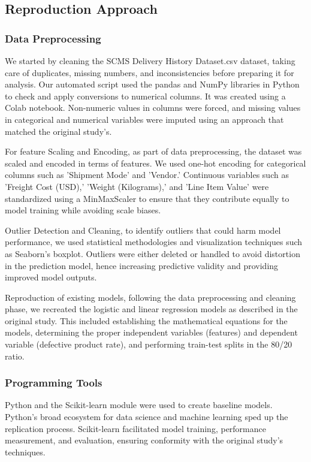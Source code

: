 \documentclass[conference]{IEEEtran}
\begin{document}
\subsection{ Reproduction Approach}

\subsubsection{Data Preprocessing}
We started by cleaning the SCMS Delivery History Dataset.csv dataset, taking care of duplicates, missing numbers, and inconsistencies before preparing it for analysis. Our automated script used the pandas and NumPy libraries in Python to check and apply conversions to numerical columns. It was created using a Colab notebook. Non-numeric values in columns were forced, and missing values in categorical and numerical variables were imputed using an approach that matched the original study's.

For feature Scaling and Encoding, as part of data preprocessing, the dataset was scaled and encoded in terms of features. We used one-hot encoding for categorical columns such as 'Shipment Mode' and 'Vendor.' Continuous variables such as 'Freight Cost (USD),' 'Weight (Kilograms),' and 'Line Item Value' were standardized using a MinMaxScaler to ensure that they contribute equally to model training while avoiding scale biases.

Outlier Detection and Cleaning, to identify outliers that could harm model performance, we used statistical methodologies and visualization techniques such as Seaborn's boxplot. Outliers were either deleted or handled to avoid distortion in the prediction model, hence increasing predictive validity and providing improved model outputs.

Reproduction of existing models, following the data preprocessing and cleaning phase, we recreated the logistic and linear regression models as described in the original study. This included establishing the mathematical equations for the models, determining the proper independent variables (features) and dependent variable (defective product rate), and performing train-test splits in the 80/20 ratio.

\subsubsection{Programming Tools}
Python and the Scikit-learn module were used to create baseline models. Python's broad ecosystem for data science and machine learning sped up the replication process. Scikit-learn facilitated model training, performance measurement, and evaluation, ensuring conformity with the original study's techniques.
\end{document}
